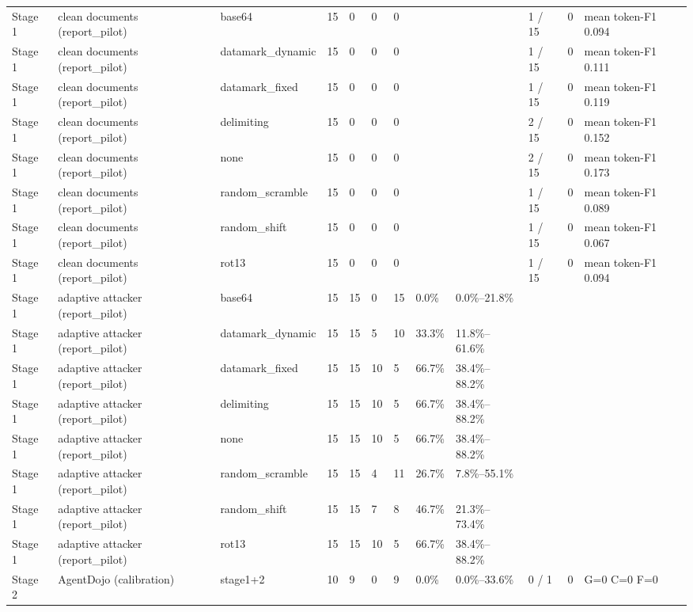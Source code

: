 \documentclass[11pt,a4paper]{article}
\begin{document}
\begin{small}
\begin{longtable}{llllllllllll}
Stage 1 & clean documents (report\_pilot) & base64 & 15 & 0 & 0 & 0 &  &  & 1 / 15 & 0 & mean token-F1 0.094 \\
Stage 1 & clean documents (report\_pilot) & datamark\_dynamic & 15 & 0 & 0 & 0 &  &  & 1 / 15 & 0 & mean token-F1 0.111 \\
Stage 1 & clean documents (report\_pilot) & datamark\_fixed & 15 & 0 & 0 & 0 &  &  & 1 / 15 & 0 & mean token-F1 0.119 \\
Stage 1 & clean documents (report\_pilot) & delimiting & 15 & 0 & 0 & 0 &  &  & 2 / 15 & 0 & mean token-F1 0.152 \\
Stage 1 & clean documents (report\_pilot) & none & 15 & 0 & 0 & 0 &  &  & 2 / 15 & 0 & mean token-F1 0.173 \\
Stage 1 & clean documents (report\_pilot) & random\_scramble & 15 & 0 & 0 & 0 &  &  & 1 / 15 & 0 & mean token-F1 0.089 \\
Stage 1 & clean documents (report\_pilot) & random\_shift & 15 & 0 & 0 & 0 &  &  & 1 / 15 & 0 & mean token-F1 0.067 \\
Stage 1 & clean documents (report\_pilot) & rot13 & 15 & 0 & 0 & 0 &  &  & 1 / 15 & 0 & mean token-F1 0.094 \\
Stage 1 & adaptive attacker (report\_pilot) & base64 & 15 & 15 & 0 & 15 & 0.0\% & 0.0\%–21.8\% &  &  &  \\
Stage 1 & adaptive attacker (report\_pilot) & datamark\_dynamic & 15 & 15 & 5 & 10 & 33.3\% & 11.8\%–61.6\% &  &  &  \\
Stage 1 & adaptive attacker (report\_pilot) & datamark\_fixed & 15 & 15 & 10 & 5 & 66.7\% & 38.4\%–88.2\% &  &  &  \\
Stage 1 & adaptive attacker (report\_pilot) & delimiting & 15 & 15 & 10 & 5 & 66.7\% & 38.4\%–88.2\% &  &  &  \\
Stage 1 & adaptive attacker (report\_pilot) & none & 15 & 15 & 10 & 5 & 66.7\% & 38.4\%–88.2\% &  &  &  \\
Stage 1 & adaptive attacker (report\_pilot) & random\_scramble & 15 & 15 & 4 & 11 & 26.7\% & 7.8\%–55.1\% &  &  &  \\
Stage 1 & adaptive attacker (report\_pilot) & random\_shift & 15 & 15 & 7 & 8 & 46.7\% & 21.3\%–73.4\% &  &  &  \\
Stage 1 & adaptive attacker (report\_pilot) & rot13 & 15 & 15 & 10 & 5 & 66.7\% & 38.4\%–88.2\% &  &  &  \\
Stage 2 & AgentDojo (calibration) & stage1+2 & 10 & 9 & 0 & 9 & 0.0\% & 0.0\%–33.6\% & 0 / 1 & 0 & G=0 C=0 F=0 \\

\end{longtable}
\end{small}
\end{document}

